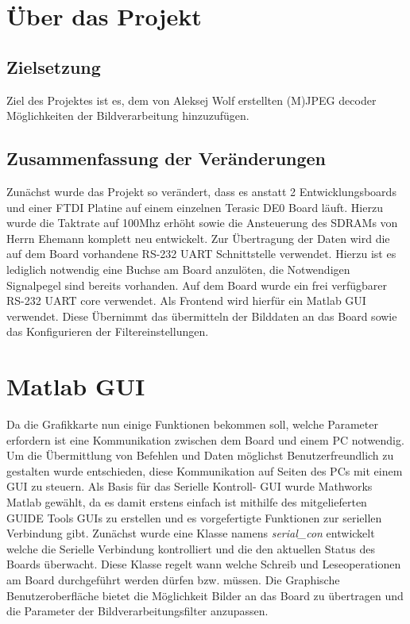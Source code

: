 \documentclass[%
  paper=A4, %
  pagesize, %
  12pt,
  ngerman   %
]{scrreprt}  %
\begin{document}




\tableofcontents
\chapter{Über das Projekt}
\section{Zielsetzung}
Ziel des Projektes ist es, dem von Aleksej Wolf erstellten (M)JPEG decoder\cite{aleksej10} Möglichkeiten der Bildverarbeitung hinzuzufügen.

\section{Zusammenfassung der Veränderungen}
Zunächst wurde das Projekt so verändert, dass es anstatt 2 Entwicklungsboards und einer FTDI Platine auf einem einzelnen Terasic DE0 Board läuft. Hierzu wurde die Taktrate auf 100Mhz erhöht sowie die Ansteuerung des SDRAMs von Herrn Ehemann komplett neu entwickelt. Zur Übertragung der Daten wird die auf dem Board vorhandene RS-232 UART Schnittstelle verwendet. Hierzu ist es lediglich notwendig eine Buchse am Board anzulöten, die Notwendigen Signalpegel sind bereits vorhanden. Auf dem Board wurde ein frei verfügbarer RS-232 UART core verwendet.\cite{miller09} Als Frontend wird hierfür ein Matlab GUI verwendet. Diese Übernimmt das übermitteln der Bilddaten an das Board sowie das Konfigurieren der Filtereinstellungen.

\chapter{Matlab GUI}
Da die Grafikkarte nun einige Funktionen bekommen soll, welche Parameter erfordern ist eine Kommunikation zwischen dem Board und einem PC notwendig. Um die Übermittlung von Befehlen und Daten möglichst Benutzerfreundlich zu gestalten wurde entschieden, diese Kommunikation auf Seiten des PCs mit einem GUI zu steuern. Als Basis für das Serielle Kontroll- GUI wurde Mathworks Matlab gewählt, da es damit erstens einfach ist mithilfe des mitgelieferten GUIDE Tools GUIs zu erstellen und es vorgefertigte Funktionen zur seriellen Verbindung gibt. Zunächst wurde eine Klasse namens \emph{serial\_con} entwickelt welche die Serielle Verbindung kontrolliert und die den aktuellen Status des Boards überwacht. Diese Klasse regelt wann welche Schreib und Leseoperationen am Board durchgeführt werden dürfen bzw. müssen. Die Graphische Benutzeroberfläche bietet die Möglichkeit Bilder an das Board zu übertragen und die Parameter der Bildverarbeitungsfilter anzupassen.
\end{document}
